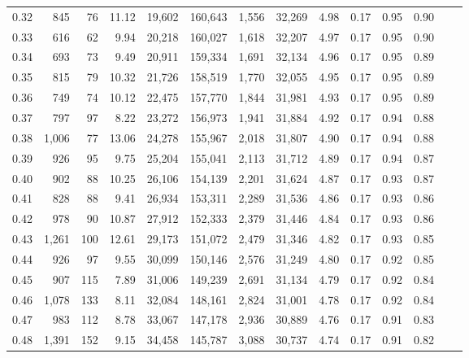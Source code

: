 \begin{tabular}{rrrrrrrrrrrrrr}
0.32 &    845 &     76 &   11.12 &   19,602 &  160,643 &   1,556 &  32,269 &  4.98 &  0.17 &  0.95 &      0.90 \\
0.33 &    616 &     62 &    9.94 &   20,218 &  160,027 &   1,618 &  32,207 &  4.97 &  0.17 &  0.95 &      0.90 \\
0.34 &    693 &     73 &    9.49 &   20,911 &  159,334 &   1,691 &  32,134 &  4.96 &  0.17 &  0.95 &      0.89 \\
0.35 &    815 &     79 &   10.32 &   21,726 &  158,519 &   1,770 &  32,055 &  4.95 &  0.17 &  0.95 &      0.89 \\
0.36 &    749 &     74 &   10.12 &   22,475 &  157,770 &   1,844 &  31,981 &  4.93 &  0.17 &  0.95 &      0.89 \\
0.37 &    797 &     97 &    8.22 &   23,272 &  156,973 &   1,941 &  31,884 &  4.92 &  0.17 &  0.94 &      0.88 \\
0.38 &  1,006 &     77 &   13.06 &   24,278 &  155,967 &   2,018 &  31,807 &  4.90 &  0.17 &  0.94 &      0.88 \\
0.39 &    926 &     95 &    9.75 &   25,204 &  155,041 &   2,113 &  31,712 &  4.89 &  0.17 &  0.94 &      0.87 \\
0.40 &    902 &     88 &   10.25 &   26,106 &  154,139 &   2,201 &  31,624 &  4.87 &  0.17 &  0.93 &      0.87 \\
0.41 &    828 &     88 &    9.41 &   26,934 &  153,311 &   2,289 &  31,536 &  4.86 &  0.17 &  0.93 &      0.86 \\
0.42 &    978 &     90 &   10.87 &   27,912 &  152,333 &   2,379 &  31,446 &  4.84 &  0.17 &  0.93 &      0.86 \\
0.43 &  1,261 &    100 &   12.61 &   29,173 &  151,072 &   2,479 &  31,346 &  4.82 &  0.17 &  0.93 &      0.85 \\
0.44 &    926 &     97 &    9.55 &   30,099 &  150,146 &   2,576 &  31,249 &  4.80 &  0.17 &  0.92 &      0.85 \\
0.45 &    907 &    115 &    7.89 &   31,006 &  149,239 &   2,691 &  31,134 &  4.79 &  0.17 &  0.92 &      0.84 \\
0.46 &  1,078 &    133 &    8.11 &   32,084 &  148,161 &   2,824 &  31,001 &  4.78 &  0.17 &  0.92 &      0.84 \\
0.47 &    983 &    112 &    8.78 &   33,067 &  147,178 &   2,936 &  30,889 &  4.76 &  0.17 &  0.91 &      0.83 \\
0.48 &  1,391 &    152 &    9.15 &   34,458 &  145,787 &   3,088 &  30,737 &  4.74 &  0.17 &  0.91 &      0.82 \\

\end{tabular}
